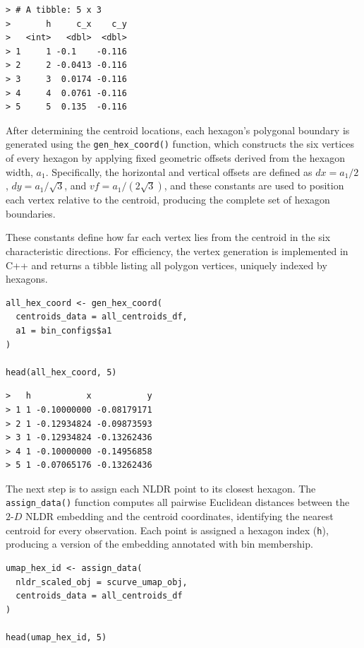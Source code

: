 \begin{verbatim}
> # A tibble: 5 x 3
>       h     c_x    c_y
>   <int>   <dbl>  <dbl>
> 1     1 -0.1    -0.116
> 2     2 -0.0413 -0.116
> 3     3  0.0174 -0.116
> 4     4  0.0761 -0.116
> 5     5  0.135  -0.116
\end{verbatim}

After determining the centroid locations, each hexagon's polygonal boundary is generated using the \texttt{gen\_hex\_coord()} function, which constructs the six vertices of every hexagon by applying fixed geometric offsets derived from the hexagon width, \(a_1\). Specifically, the horizontal and vertical offsets are defined as \(dx = a_1/2\), \(dy = a_1/\sqrt{3}\), and \(vf = a_1/(2\sqrt{3})\), and these constants are used to position each vertex relative to the centroid, producing the complete set of hexagon boundaries.

These constants define how far each vertex lies from the centroid in the six characteristic directions. For efficiency, the vertex generation is implemented in C++ and returns a tibble listing all polygon vertices, uniquely indexed by hexagons.

\begin{verbatim}
all_hex_coord <- gen_hex_coord(
  centroids_data = all_centroids_df, 
  a1 = bin_configs$a1
)

head(all_hex_coord, 5)
\end{verbatim}

\begin{verbatim}
>   h           x           y
> 1 1 -0.10000000 -0.08179171
> 2 1 -0.12934824 -0.09873593
> 3 1 -0.12934824 -0.13262436
> 4 1 -0.10000000 -0.14956858
> 5 1 -0.07065176 -0.13262436
\end{verbatim}

The next step is to assign each NLDR point to its closest hexagon. The \texttt{assign\_data()} function computes all pairwise Euclidean distances between the \(2\text{-}D\) NLDR embedding and the centroid coordinates, identifying the nearest centroid for every observation. Each point is assigned a hexagon index (\texttt{h}), producing a version of the embedding annotated with bin membership.

\begin{verbatim}
umap_hex_id <- assign_data(
  nldr_scaled_obj = scurve_umap_obj, 
  centroids_data = all_centroids_df
)

head(umap_hex_id, 5)
\end{verbatim}

